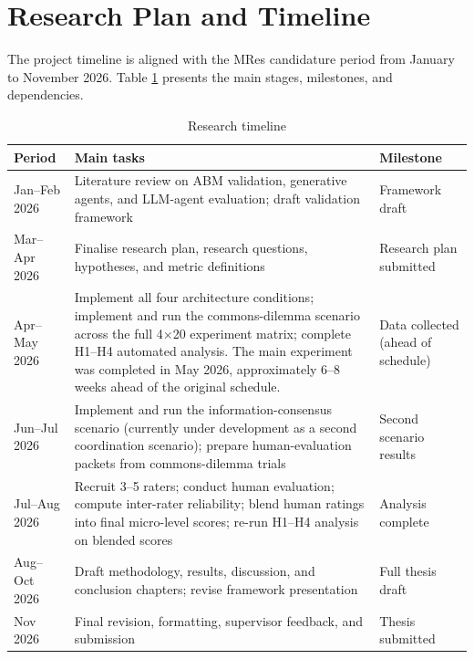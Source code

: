 \documentclass[11pt]{article}
\begin{document}
\section{Research Plan and Timeline}

The project timeline is aligned with the MRes candidature period from January to November 2026. Table \ref{tab:timeline} presents the main stages, milestones, and dependencies.

\begin{table}[h]
\centering
\caption{Research timeline}
\label{tab:timeline}
\begin{tabular}{p{}p{}p{}}
\toprule
Period & Main tasks & Milestone \\
\midrule
Jan--Feb 2026 & Literature review on ABM validation, generative agents, and LLM-agent evaluation; draft validation framework & Framework draft \\
Mar--Apr 2026 & Finalise research plan, research questions, hypotheses, and metric definitions & Research plan submitted \\
Apr--May 2026 & Implement all four architecture conditions; implement and run the commons-dilemma scenario across the full 4$\times$20 experiment matrix; complete H1--H4 automated analysis. The main experiment was completed in May 2026, approximately 6--8 weeks ahead of the original schedule. & Data collected (ahead of schedule) \\
Jun--Jul 2026 & Implement and run the information-consensus scenario (currently under development as a second coordination scenario); prepare human-evaluation packets from commons-dilemma trials & Second scenario results \\
Jul--Aug 2026 & Recruit 3--5 raters; conduct human evaluation; compute inter-rater reliability; blend human ratings into final micro-level scores; re-run H1--H4 analysis on blended scores & Analysis complete \\
Aug--Oct 2026 & Draft methodology, results, discussion, and conclusion chapters; revise framework presentation & Full thesis draft \\
Nov 2026 & Final revision, formatting, supervisor feedback, and submission & Thesis submitted \\
\bottomrule
\end{tabular}
\end{table}
\end{document}
